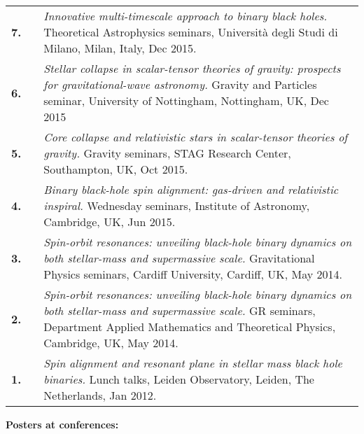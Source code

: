 \documentclass[11pt,letterpaper,sans]{moderncv}
\begin{document}
{\begin{longtable}{rp{0.3cm}p{15.8cm}}
\textbf{7.} & & \textit{Innovative multi-timescale approach to binary black holes.}
\newline{} 
Theoretical Astrophysics seminars, Università degli Studi di Milano, Milan, Italy, Dec 2015.
\vspace{0.05cm}\\
\textbf{6.} & & \textit{Stellar collapse in scalar-tensor theories of gravity: prospects for gravitational-wave astronomy.}
\newline{} 
Gravity and Particles seminar, University of Nottingham, Nottingham, UK, Dec 2015
\vspace{0.05cm}\\
\textbf{5.} & & \textit{Core collapse and relativistic stars in scalar-tensor theories of gravity.}
\newline{} 
Gravity seminars, STAG Research Center, Southampton, UK, Oct 2015.
\vspace{0.05cm}\\
\textbf{4.} & & \textit{Binary black-hole spin alignment: gas-driven and relativistic inspiral.}
\newline{} 
Wednesday seminars, Institute of Astronomy, Cambridge, UK, Jun 2015.\vspace{0.05cm}\\
\textbf{3.} & & \textit{Spin-orbit resonances: unveiling black-hole binary dynamics on both stellar-mass and supermassive scale.}
\newline{} 
Gravitational Physics seminars, Cardiff University, Cardiff, UK, May 2014.
\vspace{0.05cm}\\
\textbf{2.} & & \textit{Spin-orbit resonances: unveiling black-hole binary dynamics on both stellar-mass and supermassive scale.}
\newline{} 
GR seminars, Department Applied Mathematics and Theoretical Physics, Cambridge, UK, May 2014.
\vspace{0.05cm}\\
\textbf{1.} & & \textit{Spin alignment and resonant plane in stellar mass black hole binaries.}
\newline{} 
Lunch talks, Leiden Observatory, Leiden, The Netherlands, Jan 2012.
\vspace{0.05cm}\\
\end{longtable}
}


\textcolor{color1}{\textbf{Posters at conferences:}}
\end{document}
